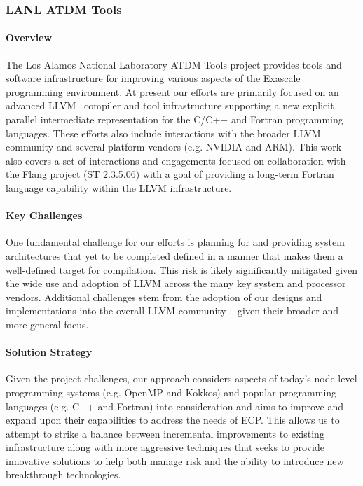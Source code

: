 \subsubsection{ LANL ATDM Tools}

\paragraph{Overview}
The Los Alamos National Laboratory ATDM Tools project provides tools
and software infrastructure for improving various aspects of the
Exascale programming environment.  At present our efforts are
primarily focused on an advanced LLVM~\cite{LLVM:2018} compiler and
tool infrastructure supporting a new explicit parallel intermediate
representation for the C/C++ and Fortran programming languages.  These
efforts also include interactions with the broader LLVM community and
several platform vendors (e.g. NVIDIA and ARM).  This work also covers
a set of interactions and engagements focused on collaboration with the
Flang project (ST 2.3.5.06) with a goal of providing a long-term Fortran
language capability within the LLVM infrastructure. 

\paragraph{Key Challenges}
One fundamental challenge for our efforts is planning for and
providing system architectures that yet to be completed defined in a
manner that makes them a well-defined target for compilation.  This
risk is likely significantly mitigated given the wide use and adoption
of LLVM across the many key system and processor vendors.  Additional
challenges stem from the adoption of our designs and implementations
into the overall LLVM community -- given their broader and more
general focus.  

\paragraph{Solution Strategy}
Given the project challenges, our approach considers aspects of
today's node-level programming systems (e.g. OpenMP and Kokkos) and
popular programming languages (e.g. C++ and Fortran) into
consideration and aims to improve and expand upon their capabilities
to address the needs of ECP.  This allows us to attempt to strike a
balance between incremental improvements to existing infrastructure
along with more aggressive techniques that seeks to provide innovative
solutions to help both manage risk and the ability to introduce new
breakthrough technologies.

